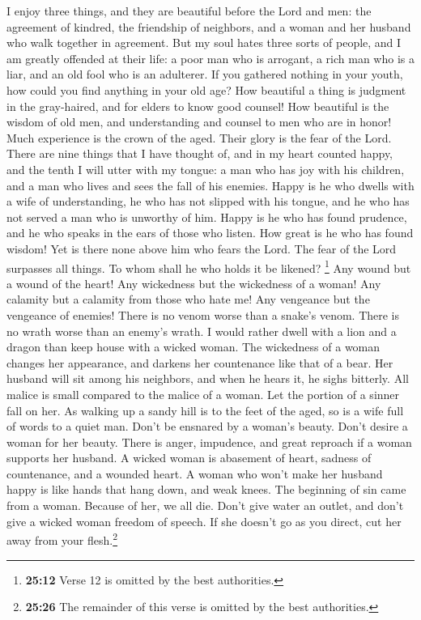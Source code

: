  I enjoy three things, and they are beautiful before the
Lord and men: the agreement of kindred, the friendship of neighbors, and
a woman and her husband who walk together in agreement. 
But my soul hates three sorts of people, and I am greatly offended at
their life: a poor man who is arrogant, a rich man who is a liar, and an
old fool who is an adulterer.  If you gathered nothing in
your youth, how could you find anything in your old age? 
How beautiful a thing is judgment in the gray-haired, and for elders to
know good counsel!  How beautiful is the wisdom of old
men, and understanding and counsel to men who are in honor!
 Much experience is the crown of the aged. Their glory is
the fear of the Lord.  There are nine things that I have
thought of, and in my heart counted happy, and the tenth I will utter
with my tongue: a man who has joy with his children, and a man who lives
and sees the fall of his enemies.  Happy is he who dwells
with a wife of understanding, he who has not slipped with his tongue,
and he who has not served a man who is unworthy of him. 
Happy is he who has found prudence, and he who speaks in the ears of
those who listen.  How great is he who has found wisdom!
Yet is there none above him who fears the Lord.  The fear
of the Lord surpasses all things. To whom shall he who holds it be
likened?  \footnote{\textbf{25:12} Verse 12 is omitted by
  the best authorities.}  Any wound but a wound of the
heart! Any wickedness but the wickedness of a woman!  Any
calamity but a calamity from those who hate me! Any vengeance but the
vengeance of enemies!  There is no venom worse than a
snake's venom. There is no wrath worse than an enemy's wrath.
 I would rather dwell with a lion and a dragon than keep
house with a wicked woman.  The wickedness of a woman
changes her appearance, and darkens her countenance like that of a bear.
 Her husband will sit among his neighbors, and when he
hears it, he sighs bitterly.  All malice is small
compared to the malice of a woman. Let the portion of a sinner fall on
her.  As walking up a sandy hill is to the feet of the
aged, so is a wife full of words to a quiet man.  Don't
be ensnared by a woman's beauty. Don't desire a woman for her beauty.
 There is anger, impudence, and great reproach if a woman
supports her husband.  A wicked woman is abasement of
heart, sadness of countenance, and a wounded heart. A woman who won't
make her husband happy is like hands that hang down, and weak knees.
 The beginning of sin came from a woman. Because of her,
we all die.  Don't give water an outlet, and don't give a
wicked woman freedom of speech.  If she doesn't go as you
direct, cut her away from your flesh.\footnote{\textbf{25:26} The
  remainder of this verse is omitted by the best authorities.}


